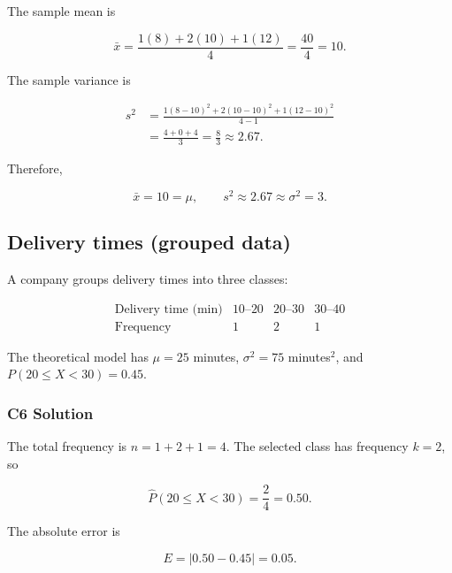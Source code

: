 The sample mean is

\[
\bar{x}
=\frac{1(8)+2(10)+1(12)}{4}
=\frac{40}{4}
=10.
\]

The sample variance is

\[
\begin{aligned}
s^2
&=\frac{1(8-10)^2+2(10-10)^2+1(12-10)^2}{4-1}\\
&=\frac{4+0+4}{3}
=\frac83
\approx2.67.
\end{aligned}
\]

Therefore,

\[
\boxed{\bar{x}=10=\mu,\qquad s^2\approx2.67\approx\sigma^2=3.}
\]


\subsection{Delivery times (grouped data)}
\label{sec:c6-probability-grouped}

A company groups delivery times into three classes:

\[
\begin{array}{c|ccc}
	\text{Delivery time (min)} & 10\text{--}20 & 20\text{--}30 & 30\text{--}40 \\ \hline
	\text{Frequency} & 1 & 2 & 1
\end{array}
\]

The theoretical model has $\mu=25$ minutes, $\sigma^2=75$ minutes$^2$,
and $P(20\leq X<30)=0.45$.


\subsubsection*{C6 Solution}
\label{subsec:c6-probability-grouped-b}

The total frequency is $n=1+2+1=4$. The selected class has frequency
$k=2$, so

\[
\widehat P(20\leq X<30)=\frac24=0.50.
\]

The absolute error is

\[
E=|0.50-0.45|=0.05.
\]

